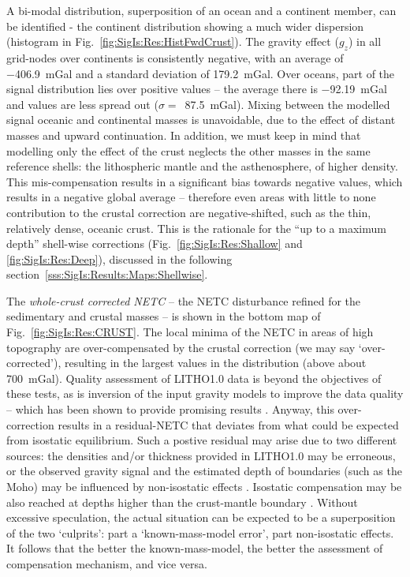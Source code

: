 A bi-modal distribution, superposition of an ocean and a continent member, can be identified - the continent distribution showing a much wider dispersion (histogram in Fig.~\ref{fig:SigIs:Res:HistFwdCrust}).
The gravity effect ($g_z$) in all grid-nodes over continents is consistently negative, with an average of \SI{-406.9}{mGal} and a standard deviation of \SI{179.2}{mGal}.
Over oceans, part of the signal distribution lies over positive values -- the average there is \SI{-92.19}{mGal} and values are less spread out ($\sigma =$~\SI{87.5}{mGal}).
Mixing between the modelled signal oceanic and continental masses is unavoidable, due to the effect of distant masses and upward continuation.
In addition, we must keep in mind that modelling only the effect of the crust neglects the other masses in the same reference shells: the lithospheric mantle and the asthenosphere, of higher density.
This mis-compensation results in a significant bias towards negative values, which results in a negative global average -- therefore even areas with little to none contribution to the crustal correction are negative-shifted, such as the thin, relatively dense, oceanic crust.
This is the rationale for the ``up to a maximum depth'' shell-wise corrections (Fig.~\ref{fig:SigIs:Res:Shallow} and \ref{fig:SigIs:Res:Deep}), discussed in the following section~\ref{sss:SigIs:Results:Maps:Shellwise}.

The \textit{whole-crust corrected NETC} -- the NETC disturbance refined for the sedimentary and crustal masses -- is shown in the bottom map of Fig.~\ref{fig:SigIs:Res:CRUST}.
The local minima of the NETC in areas of high topography are over-compensated by the crustal correction (we may say `over-corrected'), resulting in the largest values in the distribution (above about \SI[retain-explicit-plus]{+700}{mGal}).
Quality assessment of {LITHO1.0} data is beyond the objectives of these tests, as is inversion of the input gravity models to improve the data quality -- which has been shown to provide promising results \parencite[see e.g. ][]{Sjoberg2011}.
Anyway, this over-correction results in a residual-NETC that deviates from what could be expected from isostatic equilibrium.
Such a postive residual may arise due to two different sources: the densities and/or thickness provided in {LITHO1.0} may be erroneous, or the observed gravity signal and the estimated depth of boundaries (such as the Moho) may be influenced by non-isostatic effects \parencite[as defined by ][]{Bagherbandi2012}.
Isostatic compensation may be also reached at depths higher than the crust-mantle boundary \parencite{Martinec1994}.
Without excessive speculation, the actual situation can be expected to be a superposition of the two `culprits': part a `known-mass-model error', part non-isostatic effects.
It follows that the better the known-mass-model, the better the assessment of compensation mechanism, and vice versa.

